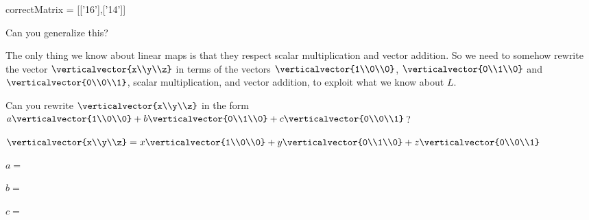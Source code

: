 \documentclass{ximera}
\begin{document}
\begin{question}
\begin{solution}
    \begin{matrix-answer}[name=v]
      correctMatrix = [['16'],['14']]
    \end{matrix-answer}
    
  \end{solution}

  Can you generalize this?

  \begin{solution}
  \begin{hint}	
  		The only thing we know about linear maps is that they respect scalar multiplication and vector addition.  So we need to somehow rewrite the vector
  		$\verticalvector{x\\y\\z}$ in terms of the vectors $\verticalvector{1\\0\\0}$, $\verticalvector{0\\1\\0}$ and $\verticalvector{0\\0\\1}$, scalar multiplication,
  		and vector addition, to exploit what we know about $L$.
  		
  		
  		
  		\begin{question}
  			Can you rewrite $\verticalvector{x\\y\\z}$ in the form $a\verticalvector{1\\0\\0}+b\verticalvector{0\\1\\0}+c\verticalvector{0\\0\\1}$?
  			\begin{solution}
  				\begin{hint}
  					$\verticalvector{x\\y\\z} = x\verticalvector{1\\0\\0}+y\verticalvector{0\\1\\0}+z\verticalvector{0\\0\\1}$
  				\end{hint}
  				$a =$ 
  			\end{solution}
  			\begin{solution}
  				$b=$ \answer{y}
  			\end{solution}
  			\begin{solution}
  				$c=$ \answer{z}
  			\end{solution}
  		\end{question}
  	\end{hint}
  	\begin{hint}
  		

\end{hint}
\end{solution}
\end{question}
\end{document}
